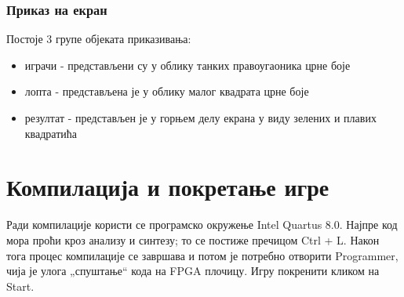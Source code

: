 \documentclass{article}
\begin{document}
\subsubsection{Приказ на екран}
Постоје 3 групе објеката приказивања:
\begin{itemize}
\item играчи - представљени су у облику танких правоугаоника црне боје
\item лопта - представљена је у облику малог квадрата црне боје
\item резултат - представљен је у горњем делу екрана у виду зелених и плавих квадратића
\end{itemize}

\section{Компилација и покретање игре}
Ради компилације користи се програмско окружење Intel Quartus 8.0. Најпре код мора проћи кроз анализу и синтезу; то се постиже пречицом Ctrl + L. Након тога процес компилације се завршава и потом је потребно отворити Programmer, чија је улога „спуштање“ кода на FPGA плочицу. Игру покренити кликом на Start.








\end{document}

